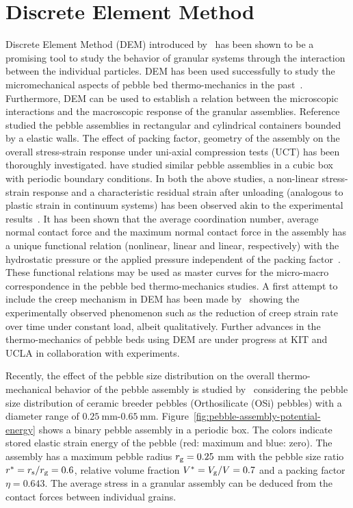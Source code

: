 \section{Discrete Element Method}
Discrete Element Method (DEM) introduced by~\cite{Cundall1979} has been shown to be a promising tool to study the behavior of granular systems through the interaction between the individual particles. DEM has been used successfully to study the micromechanical aspects of pebble bed thermo-mechanics in the past~\cite{An20072233,Gan:2010uq}. Furthermore, DEM can be used to establish a relation between the microscopic interactions and the macroscopic response of the granular assemblies. Reference \cite{An20072233} studied the pebble assemblies in rectangular and cylindrical containers bounded by a elastic walls. The effect of packing factor, geometry of the assembly on the overall stress-strain response under uni-axial compression tests (UCT) has been thoroughly investigated. \cite{Gan:2010uq} have studied similar pebble assemblies in a cubic box with periodic boundary conditions. In both the above studies, a non-linear stress-strain response and a characteristic residual strain after unloading (analogous to plastic strain in continuum systems) has been observed akin to the experimental results~\cite{Reimann:2000tw}. It has been shown that the average coordination number, average normal contact force and the maximum normal contact force in the assembly has a unique functional relation (nonlinear, linear and linear, respectively) with the hydrostatic pressure or the applied pressure independent of the packing factor~\cite{Gan:2010uq,An20071393}. These functional relations may be used as master curves for the micro-macro correspondence in the pebble bed thermo-mechanics studies. A first attempt to include the creep mechanism in DEM has been made by~\cite{An20071393} showing the experimentally observed phenomenon such as the reduction of creep strain rate over time under constant load, albeit qualitatively. Further advances in the thermo-mechanics of pebble beds using DEM are under progress at KIT and UCLA in collaboration with experiments.

Recently, the effect of the pebble size distribution on the overall thermo-mechanical behavior of the pebble assembly is studied by~\cite{Annabattula2011} considering the pebble size distribution of ceramic breeder pebbles (Orthosilicate (OSi) pebbles) with a diameter range of $0.25\ \mathrm{mm}$-$0.65\ \mathrm{mm}$. Figure~\ref{fig:pebble-assembly-potential-energy} shows a binary pebble assembly in a periodic box. The colors indicate stored elastic strain energy of the pebble (red: maximum and blue: zero). The assembly has a maximum pebble radius $r_{\mathrm{g}}=0.25$ mm with the pebble size ratio $r^{*}=r_{\mathrm{s}}/r_{\mathrm{g}}=0.6$, relative volume fraction $V^{*}=V_{\mathrm{g}}/V=0.7$ and a packing factor $\eta=0.643$. The average stress in a granular assembly can be deduced from the contact forces between individual grains.

